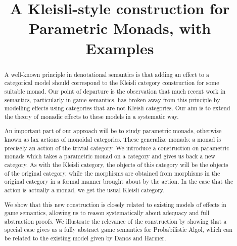 \documentclass{svproc}
\newcommand{\0}{{\mathtt{0}}} \newcommand{\com}{{\mathtt{com}}}
\begin{document}
\mainmatter              %
%
\title{A Kleisli-style construction for Parametric Monads, with Examples}
%
%
\author{}
%
\authorrunning{} %
%
\tocauthor{}
%

\maketitle              %

\begin{abstract}
  A well-known principle in denotational semantics is that adding an effect to a categorical model should correspond to the Kleisli category construction for some suitable monad.  
  Our point of departure is the observation that much recent work in semantics, particularly in game semantics, has broken away from this principle by modelling effects using categories that are not Kleisli categories.  
  Our aim is to extend the theory of monadic effects to these models in a systematic way.

  An important part of our approach will be to study parametric monads, otherwise known as lax actions of monoidal categories.
  These generalize monads: a monad is precisely an action of the trivial category.
  We introduce a construction on parametric monads which takes a parametric monad on a category and gives us back a new category.  
  As with the Kleisli category, the objects of this category will be the objects of the original category, while the morphisms are obtained from morphisms in the original category in a formal manner brought about by the action.  
  In the case that the action is actually a monad, we get the usual Kleisli category.

  We show that this new construction is closely related to existing models of effects in game semantics, allowing us to reason systematically about adequacy and full abstraction proofs.
  We illustrate the relevance of the construction by showing that a special case gives us a fully abstract game semantics for Probabilistic Algol, which can be related to the existing model given by Danos and Harmer.
\end{abstract}
\end{document}
